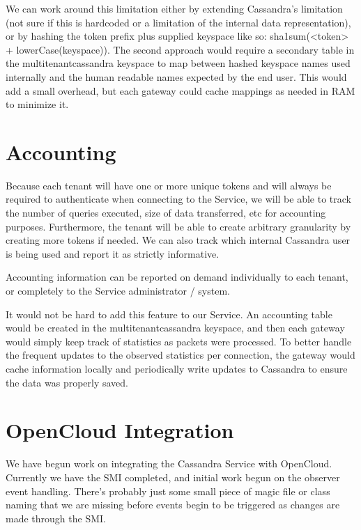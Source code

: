 \documentclass[11pt,notitlepage]{report}
\begin{document}
We can work around this limitation either by extending Cassandra’s limitation (not sure if this is hardcoded or a limitation of the internal data representation), or by hashing the token prefix plus supplied keyspace like so: sha1sum(<token> + lowerCase(keyspace)). The second approach would require a secondary table in the multitenantcassandra keyspace to map between hashed keyspace names used internally and the human readable names expected by the end user. This would add a small overhead, but each gateway could cache mappings as needed in RAM to minimize it.


\section*{Accounting}

Because each tenant will have one or more unique tokens and will always be required to authenticate when connecting to the Service, we will be able to track the number of queries executed, size of data transferred, etc for accounting purposes. Furthermore, the tenant will be able to create arbitrary granularity by creating more tokens if needed. We can also track which internal Cassandra user is being used and report it as strictly informative.

Accounting information can be reported on demand individually to each tenant, or completely to the Service administrator / system.

It would not be hard to add this feature to our Service. An accounting table would be created in the multitenantcassandra keyspace, and then each gateway would simply keep track of statistics as packets were processed. To better handle the frequent updates to the observed statistics per connection, the gateway would cache information locally and periodically write updates to Cassandra to ensure the data was properly saved.

\section*{OpenCloud Integration}

We have begun work on integrating the Cassandra Service with OpenCloud. Currently we have the SMI completed, and initial work begun on the observer event handling. There’s probably just some small piece of magic file or class naming that we are missing before events begin to be triggered as changes are made through the SMI.
\end{document}
